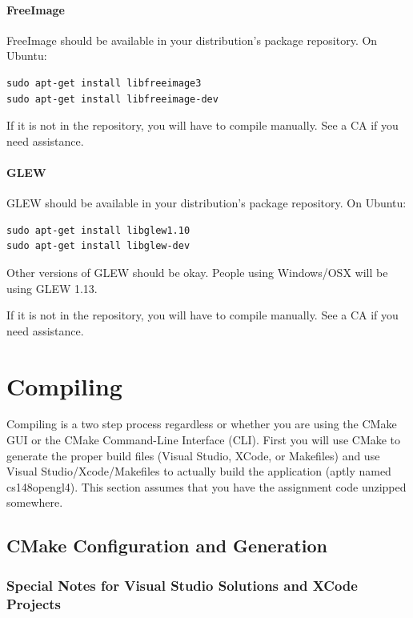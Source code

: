\documentclass{article}
\begin{document}
\paragraph{\textbf{FreeImage}}

FreeImage should be available in your distribution's package repository. On Ubuntu:

\begin{lstlisting}
sudo apt-get install libfreeimage3
sudo apt-get install libfreeimage-dev
\end{lstlisting}

If it is not in the repository, you will have to compile manually. See a CA if you need assistance.

\paragraph{\textbf{GLEW}}

GLEW should be available in your distribution's package repository. On Ubuntu:

\begin{lstlisting}
sudo apt-get install libglew1.10
sudo apt-get install libglew-dev
\end{lstlisting}

Other versions of GLEW should be okay. People using Windows/OSX will be using GLEW 1.13.

If it is not in the repository, you will have to compile manually. See a CA if you need assistance.

\section*{Compiling}

Compiling is a two step process regardless or whether you are using the CMake GUI or the CMake Command-Line Interface (CLI). First you will use CMake to generate the proper build files (Visual Studio, XCode, or Makefiles) and use Visual Studio/Xcode/Makefiles to actually build the application (aptly named cs148opengl4). This section assumes that you have the assignment code unzipped somewhere. 

\subsection*{CMake Configuration and Generation}

\subsubsection*{Special Notes for Visual Studio Solutions and XCode Projects}
\end{document}

